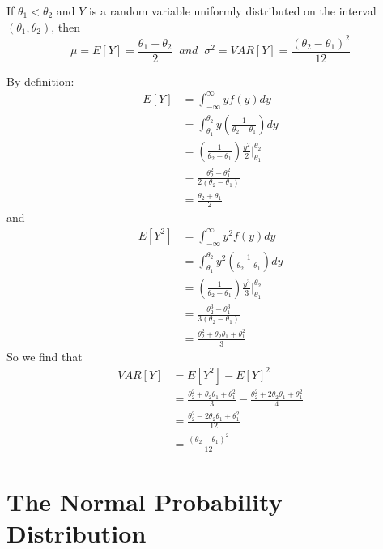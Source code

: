 \documentclass[12pt, a4paper, twoside, openright, titlepage]{book}
\begin{document}
\begin{thm}{}{}
    If $\theta_1 < \theta_2$ and $Y$ is a random variable uniformly distributed on the interval $(\theta_1,\theta_2)$, then \begin{equation*}
        \mu = E[Y] = \frac{\theta_1+\theta_2}{2}\;\;and\;\;\sigma^2 = VAR[Y] = \frac{(\theta_2-\theta_1)^2}{12}
    \end{equation*}
\end{thm}
\begin{proof*}{}{}
    By definition: \begin{align*}
        E[Y] &= \int_{-\infty}^{\infty}yf(y)dy \\
        &= \int_{\theta_1}^{\theta_2}y\left(\frac{1}{\theta_2-\theta_1}\right)dy \\
        &= \left(\frac{1}{\theta_2-\theta_1}\right)\frac{y^2}{2}\Bigg\rvert_{\theta_1}^{\theta_2} \\
        &= \frac{\theta_2^2 - \theta_1^2}{2(\theta_2-\theta_1)} \\
        &= \frac{\theta_2+\theta_1}{2}
    \end{align*}
    and \begin{align*}
        E[Y^2] &= \int_{-\infty}^{\infty}y^2f(y)dy \\
        &= \int_{\theta_1}^{\theta_2}y^2\left(\frac{1}{\theta_2-\theta_1}\right)dy \\
        &= \left(\frac{1}{\theta_2-\theta_1}\right)\frac{y^3}{3}\Bigg\rvert_{\theta_1}^{\theta_2} \\
        &= \frac{\theta_2^3 - \theta_1^3}{3(\theta_2-\theta_1)} \\
        &= \frac{\theta_2^2+\theta_2\theta_1+\theta_1^2}{3}
    \end{align*}
    So we find that \begin{align*}
        VAR[Y] &= E[Y^2] - E[Y]^2 \\
        &= \frac{\theta_2^2+\theta_2\theta_1+\theta_1^2}{3} - \frac{\theta_2^2+2\theta_2\theta_1+\theta_1^2}{4} \\
        &= \frac{\theta_2^2-2\theta_2\theta_1+\theta_1^2}{12} \\
        &= \frac{(\theta_2-\theta_1)^2}{12}
    \end{align*}
\end{proof*}

\section{\textsection The Normal Probability Distribution}
\end{document}
